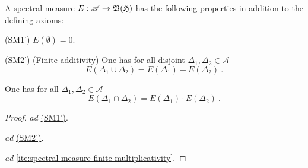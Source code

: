 \begin{proposition}
  A spectral measure $E : \mathscr{A} \to \mathfrak{B} (\mathfrak{H})$   has the following properties
  in addition to the defining axioms:
  \begin{axiomlist}[SM]\setcounter{enumi}{1}
  \item[\textup{{\sffamily (SM1')}}\hspace{-1mm}]
     $E(\emptyset) = 0$.
  \item[\textup{{\sffamily (SM2')}}\hspace{-1mm}]
     \textup{(Finite additivity)}  One has for all disjoint $\Delta_1,\Delta_2 \in \mathscr{A}$
      \[ E( \Delta_1  \cup \Delta_2) = E(\Delta_1) + E(\Delta_2) \ . \]
  \setcounter{enumi}{2}
  \item\label{ite:spectral-measure-finite-multiplicativity}
     One has for all $\Delta_1,\Delta_2 \in \mathscr{A}$ 
     \[ E( \Delta_1  \cap \Delta_2) = E(\Delta_1)\cdot E(\Delta_2) \ . \]
  \end{axiomlist}
\end{proposition}

\begin{proof}
  {\itshape ad} \hyperref[ite:spectral-measure-empty-set]{\textup{\sffamily (SM1')}}.

  {\itshape ad} \hyperref[ite:spectral-measure-finite-additivity]{\textup{\sffamily (SM2')}}.

  {\itshape ad} \ref{ite:spectral-measure-finite-multiplicativity}.
\end{proof}

